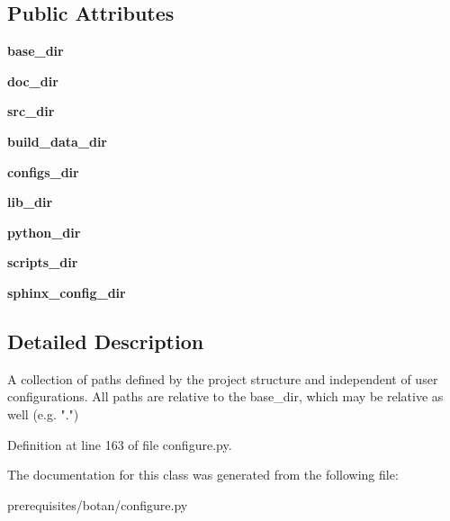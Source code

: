 \subsection*{Public Attributes}
\begin{DoxyCompactItemize}
\item 
\mbox{\label{classconfigure_1_1_source_paths_a193f600813f6b3da7fa4d7f54891533b}} 
{\bfseries base\+\_\+dir}
\item 
\mbox{\label{classconfigure_1_1_source_paths_aa9687a099c64f92e39ba99df88029285}} 
{\bfseries doc\+\_\+dir}
\item 
\mbox{\label{classconfigure_1_1_source_paths_a87e9d4278cdf66b39162ce120acccd02}} 
{\bfseries src\+\_\+dir}
\item 
\mbox{\label{classconfigure_1_1_source_paths_ac918a043ee67cf79a4155a5e9b94f163}} 
{\bfseries build\+\_\+data\+\_\+dir}
\item 
\mbox{\label{classconfigure_1_1_source_paths_a752c24a573ae3dbeb52eb613921bb475}} 
{\bfseries configs\+\_\+dir}
\item 
\mbox{\label{classconfigure_1_1_source_paths_a64576431f17c78acc12b4f51607df127}} 
{\bfseries lib\+\_\+dir}
\item 
\mbox{\label{classconfigure_1_1_source_paths_a9af496eeb00cc06964021eb167fca17a}} 
{\bfseries python\+\_\+dir}
\item 
\mbox{\label{classconfigure_1_1_source_paths_ad2bbf9697aa5c829ae42db1ee0a53587}} 
{\bfseries scripts\+\_\+dir}
\item 
\mbox{\label{classconfigure_1_1_source_paths_a29909b37e06d2d43a2cdf21d604c87a7}} 
{\bfseries sphinx\+\_\+config\+\_\+dir}
\end{DoxyCompactItemize}


\subsection{Detailed Description}
\begin{DoxyVerb}A collection of paths defined by the project structure and
independent of user configurations.
All paths are relative to the base_dir, which may be relative as well (e.g. ".")
\end{DoxyVerb}
 

Definition at line 163 of file configure.\+py.



The documentation for this class was generated from the following file\+:\begin{DoxyCompactItemize}
\item 
prerequisites/botan/configure.\+py\end{DoxyCompactItemize}
